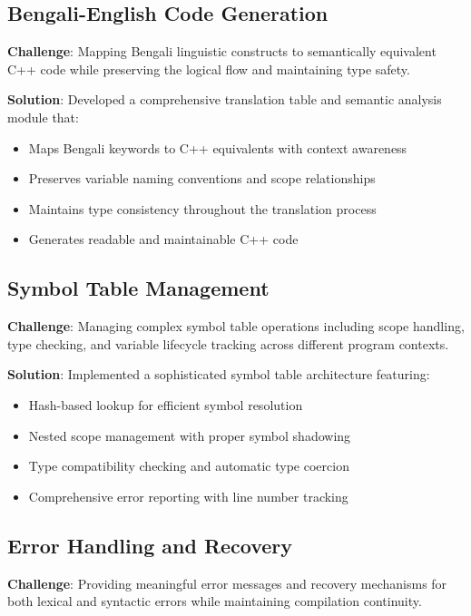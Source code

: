 \documentclass[12pt,a4paper]{article}
\begin{document}
\subsection{Bengali-English Code Generation}

\textbf{Challenge}: Mapping Bengali linguistic constructs to semantically equivalent C++ code while preserving the logical flow and maintaining type safety.

\textbf{Solution}: Developed a comprehensive translation table and semantic analysis module that:

\begin{itemize}[itemsep=2pt]
    \item Maps Bengali keywords to C++ equivalents with context awareness
    \item Preserves variable naming conventions and scope relationships
    \item Maintains type consistency throughout the translation process
    \item Generates readable and maintainable C++ code
\end{itemize}

\subsection{Symbol Table Management}

\textbf{Challenge}: Managing complex symbol table operations including scope handling, type checking, and variable lifecycle tracking across different program contexts.

\textbf{Solution}: Implemented a sophisticated symbol table architecture featuring:

\begin{itemize}[itemsep=2pt]
    \item Hash-based lookup for efficient symbol resolution
    \item Nested scope management with proper symbol shadowing
    \item Type compatibility checking and automatic type coercion
    \item Comprehensive error reporting with line number tracking
\end{itemize}

\subsection{Error Handling and Recovery}

\textbf{Challenge}: Providing meaningful error messages and recovery mechanisms for both lexical and syntactic errors while maintaining compilation continuity.
\end{document}
